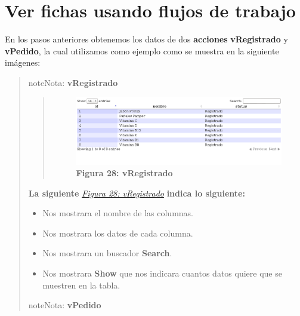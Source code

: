 \documentclass[letterpaper,11pt,spanish]{sphinxmanual}
\begin{document}
\chapter{Ver fichas usando flujos de trabajo}
\label{_templates/Contenido6/Parte5:ver-fichas-usando-flujos-de-trabajo}\label{_templates/Contenido6/Parte5:id4}\label{_templates/Contenido6/Parte5::doc}
En los pasos anteriores obtenemos los datos de dos \textbf{acciones} \textbf{vRegistrado} y \textbf{vPedido}, la cual utilizamos como ejemplo como se muestra en la siguiente imágenes:
\begin{quote}

\begin{notice}{note}{Nota:}
\textbf{vRegistrado}
\begin{quote}
\begin{figure}[htbp]
\centering
\capstart

\includegraphics{json.png}
\caption{\textbf{Figura 28: vRegistrado}}\label{_templates/Contenido6/Parte5:figura41}\end{figure}
\end{quote}

\textbf{La siguiente} {\hyperref[_templates/Contenido6/Parte5:figura41]{\emph{Figura 28: vRegistrado}}} \textbf{indica lo siguiente:}
\begin{itemize}
\item {} 
Nos mostrara el nombre de las columnas.

\item {} 
Nos mostrara los datos de cada columna.

\item {} 
Nos mostrara un buscador \textbf{Search}.

\item {} 
Nos mostrara \textbf{Show} que nos indicara
cuantos datos quiere que se muestren en la tabla.

\end{itemize}
\end{notice}

\begin{notice}{note}{Nota:}
\textbf{vPedido}
\begin{quote}
\begin{figure}[htbp]
\centering
\capstart


\end{figure}
\end{quote}
\end{notice}
\end{quote}
\end{document}
